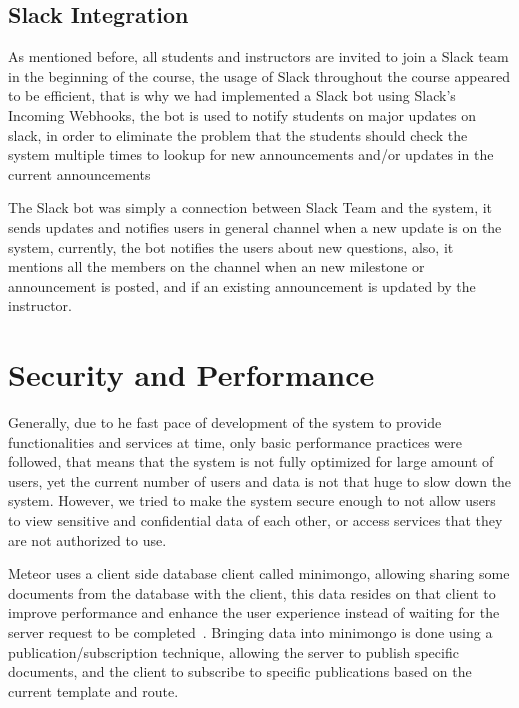 \subsection{Slack\texttrademark{} Integration}
\label{sub:slack}
As mentioned before, all students and instructors are invited to join a Slack\texttrademark{} team in the beginning of the course,
the usage of Slack\texttrademark{} throughout the course appeared to be efficient, that is why we had implemented a Slack\texttrademark{} bot using
Slack\texttrademark{}'s Incoming Webhooks, the bot is used to notify students on major updates on slack, in order to eliminate the
problem that the students should check the system multiple times to lookup for new announcements and/or updates in the current announcements

\newParagraph
The Slack\texttrademark{} bot was simply a connection between Slack\texttrademark{} Team and the system, it sends updates and notifies
users in general channel when a new update is on the system, currently, the bot notifies the users about new questions, also, it mentions all
the members on the channel when an new milestone or announcement is posted, and if an existing announcement is updated by the instructor.


\section{Security and Performance}
\label{sec:security}
Generally, due to he fast pace of development of the system to provide functionalities and services at time, only basic performance
practices were followed, that means that the system is not fully optimized for large amount of users, yet the current number
of users and data is not that huge to slow down the system. However, we tried to make the system secure enough to not allow users to
view sensitive and confidential data of each other, or access services that they are not authorized to use.

\newParagraph
Meteor uses a client side database client called minimongo, allowing sharing some documents from the database with the client, this
data resides on that client to improve performance and enhance the user experience instead of waiting for the server request to be
completed~\cite{meteor_minimongo}. Bringing data into minimongo is done using a publication/subscription technique, allowing
the server to publish specific documents, and the client to subscribe to specific publications based on the current template and
route.

